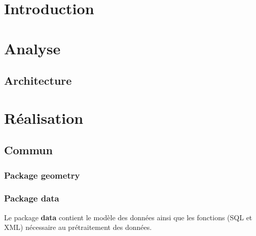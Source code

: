 \documentclass[12pt,a4paper,oneside]{article}
\begin{document}
\newpage

\tableofcontents
\newpage

\section{Introduction}


\section{Analyse}

\subsection{Architecture}


\section{Réalisation}

\subsection{Commun}
\subsubsection{Package geometry}
\subsubsection{Package data}
Le package \textbf{data} contient le modèle des données ainsi que les fonctions (SQL et XML) nécessaire au prétraitement des données.
\end{document}
